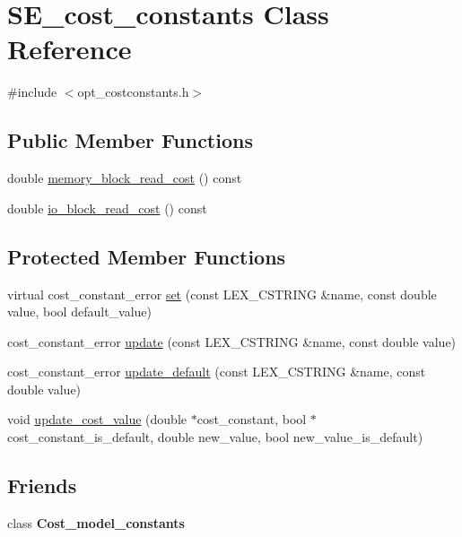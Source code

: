 \hypertarget{classSE__cost__constants}{}\section{S\+E\+\_\+cost\+\_\+constants Class Reference}
\label{classSE__cost__constants}


{\ttfamily \#include $<$opt\+\_\+costconstants.\+h$>$}

\subsection*{Public Member Functions}
\begin{DoxyCompactItemize}
\item 
double \mbox{\hyperlink{classSE__cost__constants_a9c48a1d96a3876f417264945ed026627}{memory\+\_\+block\+\_\+read\+\_\+cost}} () const
\item 
double \mbox{\hyperlink{classSE__cost__constants_af2d93f7ee2b5641b14d359bedf9ab0cf}{io\+\_\+block\+\_\+read\+\_\+cost}} () const
\end{DoxyCompactItemize}
\subsection*{Protected Member Functions}
\begin{DoxyCompactItemize}
\item 
virtual cost\+\_\+constant\+\_\+error \mbox{\hyperlink{classSE__cost__constants_a74c269c75626b79462acd12ffd655421}{set}} (const L\+E\+X\+\_\+\+C\+S\+T\+R\+I\+NG \&name, const double value, bool default\+\_\+value)
\item 
cost\+\_\+constant\+\_\+error \mbox{\hyperlink{classSE__cost__constants_a91c151b976035d5772e9db4f2f5b7b34}{update}} (const L\+E\+X\+\_\+\+C\+S\+T\+R\+I\+NG \&name, const double value)
\item 
cost\+\_\+constant\+\_\+error \mbox{\hyperlink{classSE__cost__constants_a41826c66d515c8c85cb21858e424bd97}{update\+\_\+default}} (const L\+E\+X\+\_\+\+C\+S\+T\+R\+I\+NG \&name, const double value)
\item 
void \mbox{\hyperlink{classSE__cost__constants_a7dfacb0c46f0f3c5f3941c226fc43201}{update\+\_\+cost\+\_\+value}} (double $\ast$cost\+\_\+constant, bool $\ast$cost\+\_\+constant\+\_\+is\+\_\+default, double new\+\_\+value, bool new\+\_\+value\+\_\+is\+\_\+default)
\end{DoxyCompactItemize}
\subsection*{Friends}
\begin{DoxyCompactItemize}
\item 
\mbox{\label{classSE__cost__constants_a89234022b3383f6f23831568979c4ab3}} 
class {\bfseries Cost\+\_\+model\+\_\+constants}
\end{DoxyCompactItemize}


